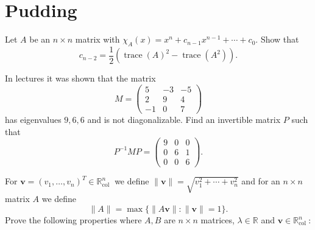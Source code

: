 \documentclass[answers]{exam}
\begin{document}
\section*{Pudding}
\begin{questions}

\question%
Let $A$ be an $n \times n$ matrix with $\chi_{A}(x)=x^{n}+c_{n-1} x^{n-1}+\cdots+c_{0}$. Show that \[
	c_{n-2}=\frac{1}{2}(\operatorname{trace}(A)^{2}-\operatorname{trace}(A^{2})).
\]



\question%
In lectures it was shown that the matrix \[
	M=\begin{pmatrix}
		5 & -3 & -5 \\
		2 & 9 & 4 \\
		-1 & 0 & 7
	\end{pmatrix}
\] has eigenvalues $9,6,6$ and is not diagonalizable. Find an invertible matrix $P$ such that \[
	P^{-1} M P=\begin{pmatrix}
		9 & 0 & 0 \\
		0 & 6 & 1 \\
		0 & 0 & 6
	\end{pmatrix}.
\]



\question%
For $\mathbf{v}=\left(v_{1}, \ldots, v_{n}\right)^{T} \in \mathbb{R}_{\text {col }}^{n}$ we define $\|\mathbf{v}\|=\sqrt{v_{1}^{2}+\cdots+v_{n}^{2}}$ and for an $n \times n$ matrix $A$ we define \[
	\|A\|=\max \{\|A \mathbf{v}\|:\|\mathbf{v}\|=1\}.
\] Prove the following properties where $A, B$ are $n \times n$ matrices, $\lambda \in \mathbb{R}$ and $\mathbf{v} \in \mathbb{R}_{\text {col }}^{n}$:
\end{questions}
\end{document}
